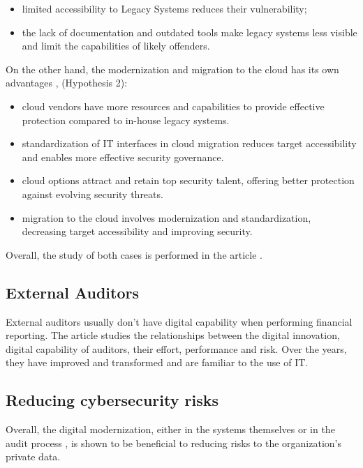 \documentclass[journal]{IEEEtran}
\begin{document}
\begin{itemize}
    \item limited accessibility to Legacy Systems reduces their vulnerability;
    \item the lack of documentation and outdated tools make legacy systems less visible and limit the capabilities of likely offenders.
\end{itemize}

On the other hand, the modernization and migration to the cloud has its own advantages \cite{bastos_1}, (Hypothesis 2):  

\begin{itemize}
    \item cloud vendors have more resources and capabilities to provide effective protection compared to in-house legacy systems.
    \item standardization of IT interfaces in cloud migration reduces target accessibility and enables more effective security governance.
    \item cloud options attract and retain top security talent, offering better protection against evolving security threats.
    \item migration to the cloud involves modernization and standardization, decreasing target accessibility and improving security.
\end{itemize}

Overall, the study of both cases is performed in the article \cite{bastos_1}. 


\subsection{External Auditors}

External auditors usually don't have digital capability when performing financial reporting. The article \cite{bastos_2} studies the relationships between the digital innovation, digital capability of auditors, their effort, performance and risk. 
Over the years, they have improved and transformed and are familiar to the use of IT. 


\subsection{Reducing cybersecurity risks}

Overall, the digital modernization, either in the systems themselves \cite{bastos_1} or in the audit process \cite{bastos_2}, is shown to be beneficial to reducing risks to the organization's private data. 
\end{document}
